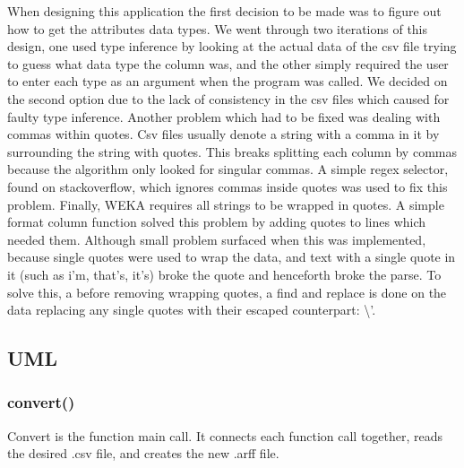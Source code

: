 \documentclass[11pt]{article} %
\begin{document}
When designing this application the first decision to be made was to figure out how to get the attributes data types. We went through two iterations of this design, one used type inference by looking at the actual data of the csv file trying to guess what data type the column was, and the other simply required the user to enter each type as an argument when the program was called. We decided on the second option due to the lack of consistency in the csv files which caused for faulty type inference. Another problem which had to be fixed was dealing with commas within quotes. Csv files usually denote a string with a comma in it by surrounding the string with quotes. This breaks splitting each column by commas because the algorithm only looked for singular commas. A simple regex selector, found on stackoverflow, which ignores commas inside quotes was used to fix this problem. Finally, WEKA requires all strings to be wrapped in quotes. A simple format column function solved this problem by adding quotes to lines which needed them. Although small problem surfaced when this was implemented, because single quotes were used to wrap the data, and text with a single quote in it (such as i'm, that's, it's) broke the quote and henceforth broke the parse. To solve this, a before removing wrapping quotes, a find and replace is done on the data replacing any single quotes with their escaped counterpart: \textbackslash'.

\subsection{UML}
\begin{center}
\end{center}

\subsubsection{convert()}
Convert is the function main call. It connects each function call together, reads the desired .csv file, and creates the new .arff file.
\end{document}
